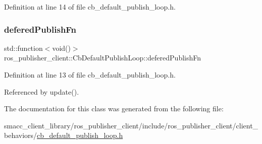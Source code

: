 Definition at line 14 of file cb\+\_\+default\+\_\+publish\+\_\+loop.\+h.

\mbox{\label{classros__publisher__client_1_1CbDefaultPublishLoop_a321f79f015449668a184cd30b6c2ad51}} 
\subsubsection{\texorpdfstring{defered\+Publish\+Fn}{deferedPublishFn}}
{\footnotesize\ttfamily std\+::function$<$void()$>$ ros\+\_\+publisher\+\_\+client\+::\+Cb\+Default\+Publish\+Loop\+::defered\+Publish\+Fn\hspace{0.3cm}{\ttfamily [private]}}



Definition at line 13 of file cb\+\_\+default\+\_\+publish\+\_\+loop.\+h.



Referenced by update().



The documentation for this class was generated from the following file\+:\begin{DoxyCompactItemize}
\item 
smacc\+\_\+client\+\_\+library/ros\+\_\+publisher\+\_\+client/include/ros\+\_\+publisher\+\_\+client/client\+\_\+behaviors/\hyperlink{cb__default__publish__loop_8h}{cb\+\_\+default\+\_\+publish\+\_\+loop.\+h}\end{DoxyCompactItemize}
